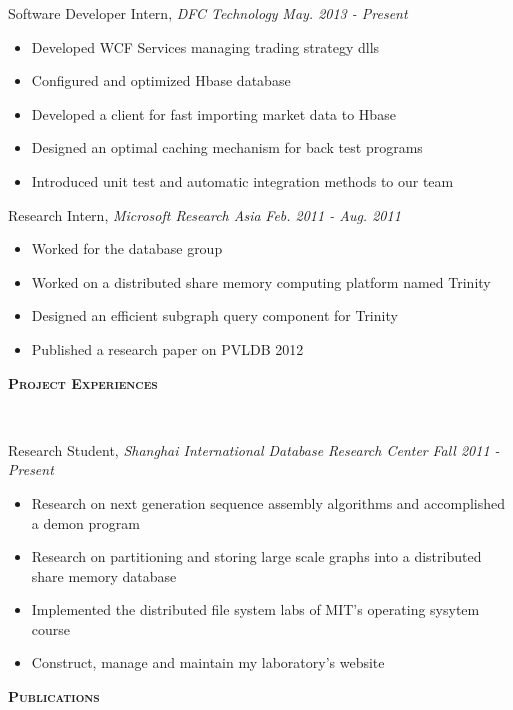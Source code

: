 \documentclass[9pt]{article}
\newenvironment{changemargin}[2]{%
  \begin{list}{}{%
    \setlength{\topsep}{0pt}%
    \setlength{\leftmargin}{#1}%
    \setlength{\rightmargin}{#2}%
    \setlength{\listparindent}{\parindent}%
    \setlength{\itemindent}{\parindent}%
    \setlength{\parsep}{\parskip}%
  }%
  \item[]}{\end{list}
}
\newcommand{\lineover}{
	\begin{changemargin}{-0.05in}{-0.05in}
		\vspace*{-8pt}
		\hrulefill \\
		\vspace*{-2pt}
	\end{changemargin}
}
\newcommand{\header}[1]{
	\begin{changemargin}{-0.5in}{-0.5in}
		\scshape{#1}\\
  	\lineover
	\end{changemargin}
}
\newenvironment{body} {
	\vspace*{-16pt}
	\begin{changemargin}{-0.25in}{-0.5in}
  }	
	{\end{changemargin}
}
\begin{document}
\begin{body}
	\vspace{14pt}
    Software Developer Intern, \emph{DFC Technology} \hfill \emph{May. 2013 - Present}\\
    \vspace*{-4pt}
    \begin{itemize} \itemsep -0pt
    \item Developed WCF Services managing trading strategy dlls
    \item Configured and optimized Hbase database
    \item Developed a client for fast importing market data to Hbase
    \item Designed an optimal caching mechanism for back test programs
    \item Introduced unit test and automatic integration methods to our team
    \end{itemize}

    Research Intern, \emph{Microsoft Research Asia} \hfill \emph{Feb. 2011 - Aug. 2011}\\
    \vspace*{-4pt}
    \begin{itemize} \itemsep -0pt
        \item Worked for the database group
        \item Worked on a distributed share memory computing platform named Trinity
        \item Designed an efficient subgraph query component for Trinity
        \item Published a research paper on PVLDB 2012
    \end{itemize}
\end{body}

\smallskip


\header{\textbf{Project Experiences}}

\begin{body}
    \vspace{14pt}
    Research Student, \emph{Shanghai International Database Research Center} \hfill \emph{Fall 2011 - Present}
    \vspace*{-4pt}
    \begin{itemize} \itemsep -0pt
        \item Research on next generation sequence assembly algorithms and accomplished a demon program
        \item Research on partitioning and storing large scale graphs into a distributed share memory database
        \item Implemented the distributed file system labs of MIT's operating sysytem course
        \item Construct, manage and maintain my laboratory's website
    \end{itemize}
\end{body}
\smallskip
\header{\textbf{Publications}}
\end{document}
